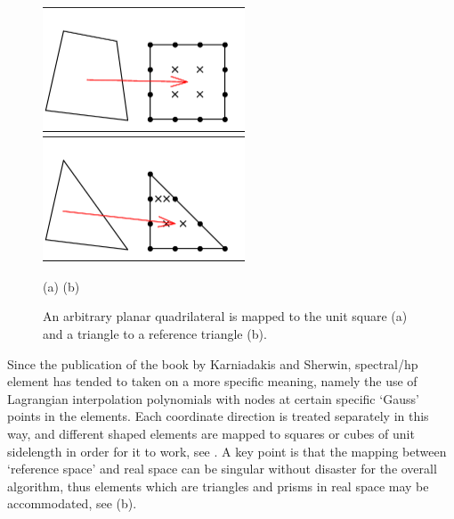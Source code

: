 \begin{figure}[h]
\centerline{\includegraphics[width=6cm]{../pics/mapquad}
\hspace{1cm}\includegraphics[width=6cm]{../pics/maptri}}
\centerline{(a) \hspace{7cm} (b)}
\caption{An arbitrary planar quadrilateral is mapped to the
unit square (a) and a triangle to a reference triangle (b).
\label{fig:maps}}
\end{figure}

Since the publication of the book by Karniadakis and Sherwin, %
spectral/hp element has tended to taken on a more specific meaning, namely the use
of Lagrangian interpolation polynomials with nodes at certain specific
`Gauss' points in the elements. Each coordinate direction is treated
separately in this way, and different shaped elements are mapped to
squares or cubes of unit sidelength in order for it to work, see .
A key point
is that the mapping between `reference space' and real space can be singular
without disaster for the overall algorithm, thus elements
which are triangles and prisms in real space may be accommodated,
see (b).

